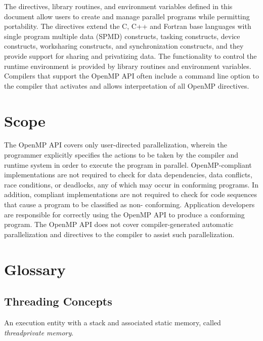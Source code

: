 The directives, library routines, and environment variables defined in this document 
allow users to create and manage parallel programs while permitting portability. The 
directives extend the C, C++ and Fortran base languages with single program multiple 
data (SPMD) constructs, tasking constructs, device constructs, worksharing constructs, 
and synchronization constructs, and they provide support for sharing and privatizing 
data. The functionality to control the runtime environment is provided by library 
routines and environment variables. Compilers that support the OpenMP API often 
include a command line option to the compiler that activates and allows interpretation of 
all OpenMP directives.







\section{Scope}
\label{sec:Scope}
The OpenMP API covers only user-directed parallelization, wherein the programmer 
explicitly specifies the actions to be taken by the compiler and runtime system in order 
to execute the program in parallel. OpenMP-compliant implementations are not required 
to check for data dependencies, data conflicts, race conditions, or deadlocks, any of 
which may occur in conforming programs. In addition, compliant implementations are 
not required to check for code sequences that cause a program to be classified as non-
conforming. Application developers are responsible for correctly using the OpenMP API 
to produce a conforming program. The OpenMP API does not cover compiler-generated 
automatic parallelization and directives to the compiler to assist such parallelization.







\section{Glossary}
\label{sec:Glossary}
\subsection{Threading Concepts}
\label{subsec:Threading Concepts}
\glossarydefstart
An execution entity with a stack and associated static memory, called 
\emph{threadprivate memory}.
\glossarydefend

